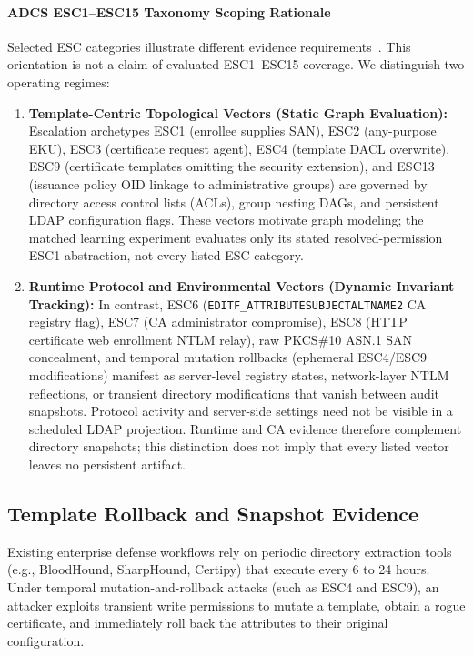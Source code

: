 \paragraph{ADCS ESC1--ESC15 Taxonomy Scoping Rationale}
Selected ESC categories illustrate different evidence requirements~\cite{schroeder2021certified,lyak2021certipy}. This orientation is not a claim of evaluated ESC1--ESC15 coverage. We distinguish two operating regimes:
\begin{enumerate}
    \item \textbf{Template-Centric Topological Vectors (Static Graph Evaluation):} Escalation archetypes ESC1 (enrollee supplies SAN), ESC2 (any-purpose EKU), ESC3 (certificate request agent), ESC4 (template DACL overwrite), ESC9 (certificate templates omitting the security extension), and ESC13 (issuance policy OID linkage to administrative groups) are governed by directory access control lists (ACLs), group nesting DAGs, and persistent LDAP configuration flags. These vectors motivate graph modeling; the matched learning experiment evaluates only its stated resolved-permission ESC1 abstraction, not every listed ESC category.
    \item \textbf{Runtime Protocol and Environmental Vectors (Dynamic Invariant Tracking):} In contrast, ESC6 (\texttt{EDITF\_ATTRIBUTESUBJECTALTNAME2} CA registry flag), ESC7 (CA administrator compromise), ESC8 (HTTP certificate web enrollment NTLM relay), raw PKCS\#10 ASN.1 SAN concealment, and temporal mutation rollbacks (ephemeral ESC4/ESC9 modifications) manifest as server-level registry states, network-layer NTLM reflections, or transient directory modifications that vanish between audit snapshots. Protocol activity and server-side settings need not be visible in a scheduled LDAP projection. Runtime and CA evidence therefore complement directory snapshots; this distinction does not imply that every listed vector leaves no persistent artifact.
\end{enumerate}

\subsection{Template Rollback and Snapshot Evidence}
Existing enterprise defense workflows rely on periodic directory extraction tools (e.g., BloodHound, SharpHound, Certipy) that execute every 6 to 24 hours. Under temporal mutation-and-rollback attacks (such as ESC4 and ESC9), an attacker exploits transient write permissions to mutate a template, obtain a rogue certificate, and immediately roll back the attributes to their original configuration.

